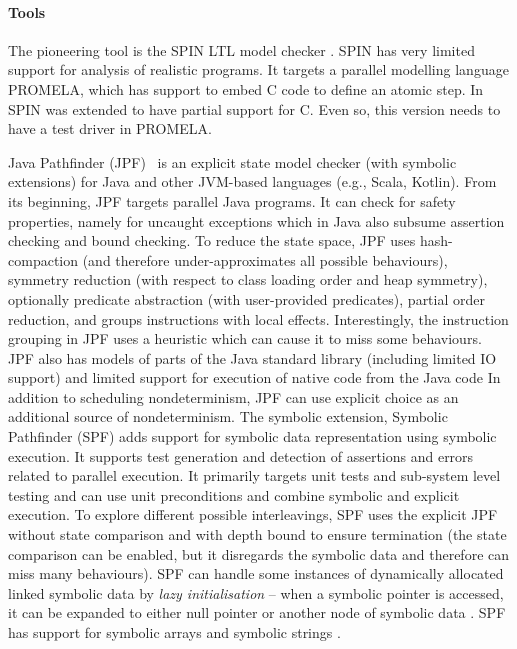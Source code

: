 \paragraph{Tools}

The pioneering tool is the SPIN LTL model checker
.
SPIN has very limited support for analysis of realistic programs.
It targets a parallel modelling language PROMELA, which has support to embed C
code to define an atomic step.
In~ SPIN was extended to have partial support for C.
Even so, this version needs to have a test driver in PROMELA.

Java Pathfinder (JPF)~ is an explicit state model
checker (with symbolic extensions) for Java and other JVM-based languages (e.g., Scala, Kotlin).
From its beginning, JPF targets parallel Java programs.
It can check for safety properties, namely for uncaught exceptions which in Java also subsume assertion checking and bound checking.
To reduce the state space, JPF uses hash-compaction (and therefore under-approximates all possible behaviours), symmetry reduction (with respect to class loading order and heap symmetry), optionally predicate abstraction (with user-provided predicates), partial order reduction, and groups instructions with local effects.
Interestingly, the instruction grouping in JPF uses a heuristic which can cause it to miss some behaviours.
JPF also has models of parts of the Java standard library (including limited IO
support) and limited support for execution of native code from the Java
code
In addition to scheduling nondeterminism, JPF can use explicit choice as an
additional source of nondeterminism.
The symbolic extension, Symbolic Pathfinder (SPF)  adds
support for symbolic data representation using symbolic execution.
It supports test generation and detection of assertions and errors related to parallel execution.
It primarily targets unit tests and sub-system level testing and can use unit
preconditions and combine symbolic and explicit execution.
To explore different possible interleavings, SPF uses the explicit JPF without
state comparison and with depth bound to ensure termination (the state
comparison can be enabled, but it disregards the symbolic data and therefore
can miss many behaviours).
SPF can handle some instances of dynamically allocated
linked symbolic data by \emph{lazy initialisation} -- when a symbolic pointer
is accessed, it can be expanded to either null pointer or another node of
symbolic data .
SPF has support for symbolic arrays  and symbolic strings .

